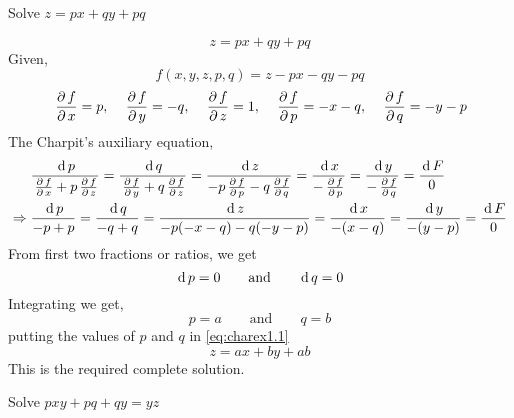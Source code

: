 \documentclass[../main-sheet.tex]{subfiles}
\begin{document}
\begin{prob}
    Solve \(z=px+qy+pq\)
\end{prob}
\begin{soln}
    \begin{equation}
        z=px+qy+pq \label{eq:charex1.1}
    \end{equation}
    Given,
    \[
        f(x,y,z,p,q)=z-px-qy-pq
    \]
    \[
        \,\frac{\partial\, f}{\partial\, x}=p,\quad\,\frac{\partial\, f}{\partial\, y}=-q,\quad\,\frac{\partial\, f}{\partial\, z}=1,\quad\,\frac{\partial\, f}{\partial\, p}=-x-q,\quad\,\frac{\partial\, f}{\partial\, q}=-y-p
        \]
        The Charpit's auxiliary equation,
        \begin{align*}
            &\frac{\,\mathrm{d}\, p}{\,\frac{\partial\, f}{\partial\, x}+p\,\frac{\partial\, f}{\partial\, z}}=\frac{\,\mathrm{d}\, q}{\,\frac{\partial\, f}{\partial\, y}+q\,\frac{\partial\, f}{\partial\, z}}=\frac{\,\mathrm{d}\, z}{-p\,\frac{\partial\, f}{\partial\, p}-q\,\frac{\partial\, f}{\partial\, q}}=\frac{\,\mathrm{d}\, x}{-\,\frac{\partial\, f}{\partial\, p}}=\frac{\,\mathrm{d}\, y}{-\,\frac{\partial\, f}{\partial\, q}}=\frac{\,\mathrm{d}\, F}{0}\\
            \Rightarrow\;&\frac{\,\mathrm{d}\, p}{-p+p}=\frac{\,\mathrm{d}\, q}{-q+q}=\frac{\,\mathrm{d}\, z}{-p(-x-q)-q(-y-p)}=\frac{\,\mathrm{d}\, x}{-(x-q)}=\frac{\,\mathrm{d}\, y}{-(y-p)}=\frac{\,\mathrm{d}\, F}{0}
        \end{align*}
        From first two fractions or ratios, we get 
        \[\,\mathrm{d}\, p=0\qquad\text{and}\qquad \,\mathrm{d}\, q=0\]
        Integrating we get,
        \[p=a\qquad\text{and}\qquad q=b\]
        putting the values of \(p\) and \(q \) in \eqref{eq:charex1.1}
        \[z=ax+by+ab\]
        This is the required complete solution.
\end{soln}
\begin{prob}
    Solve \(pxy+pq+qy=yz\)
\end{prob}
\end{document}
